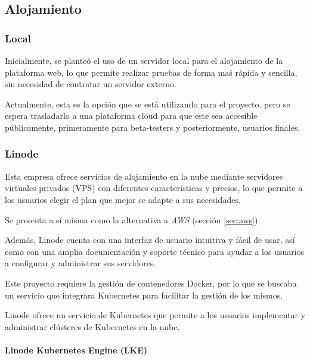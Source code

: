         \subsection{Alojamiento}
            \label{sec:alojamiento}

            \subsubsection{Local}

                Inicialmente, se planteó el uso de un servidor local para el alojamiento de la plataforma web, lo que permite realizar pruebas de forma maś rápida y sencilla, sin necesidad de contratar un servidor externo.

                Actualmente, esta es la opción que se está utilizando para el proyecto, pero se espera trasladarlo a una plataforma cloud para que este sea accesible públicamente, primeramente para beta-testers y posteriormente, usuarios finales.
                
            \subsubsection{Linode}

                Esta empresa ofrece servicios de alojamiento en la nube mediante servidores virtuales privados (VPS) con diferentes características y precios, lo que permite a los usuarios elegir el plan que mejor se adapte a sus necesidades.

                Se presenta a sí misma como la alternativa a \textit{AWS} (sección \ref{sec:aws}).

                Además, Linode cuenta con una interfaz de usuario intuitiva y fácil de usar, así como con una amplia documentación y soporte técnico para ayudar a los usuarios a configurar y administrar sus servidores.

                Este proyecto requiere la gestión de contenedores Docker, por lo que se buscaba un servicio que integrara Kubernetes para facilitar la gestión de los mismos.
                
                Linode ofrece un servicio de Kubernetes que permite a los usuarios implementar y administrar clústeres de Kubernetes en la nube.

                \paragraph{Linode Kubernetes Engine (LKE)}

